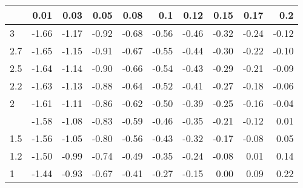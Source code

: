 
\begin{tabular}{lrrrrrrrrr}
\toprule
  & 0.01 & 0.03 & 0.05 & 0.08 & 0.1 & 0.12 & 0.15 & 0.17 & 0.2\\
\midrule
3 & -1.66 & -1.17 & -0.92 & -0.68 & -0.56 & -0.46 & -0.32 & -0.24 & -0.12\\
2.7 & -1.65 & -1.15 & -0.91 & -0.67 & -0.55 & -0.44 & -0.30 & -0.22 & -0.10\\
2.5 & -1.64 & -1.14 & -0.90 & -0.66 & -0.54 & -0.43 & -0.29 & -0.21 & -0.09\\
2.2 & -1.63 & -1.13 & -0.88 & -0.64 & -0.52 & -0.41 & -0.27 & -0.18 & -0.06\\
2 & -1.61 & -1.11 & -0.86 & -0.62 & -0.50 & -0.39 & -0.25 & -0.16 & -0.04\\
\addlinespace
1.7 & -1.58 & -1.08 & -0.83 & -0.59 & -0.46 & -0.35 & -0.21 & -0.12 & 0.01\\
1.5 & -1.56 & -1.05 & -0.80 & -0.56 & -0.43 & -0.32 & -0.17 & -0.08 & 0.05\\
1.2 & -1.50 & -0.99 & -0.74 & -0.49 & -0.35 & -0.24 & -0.08 & 0.01 & 0.14\\
1 & -1.44 & -0.93 & -0.67 & -0.41 & -0.27 & -0.15 & 0.00 & 0.09 & 0.22\\
\bottomrule
\end{tabular}
